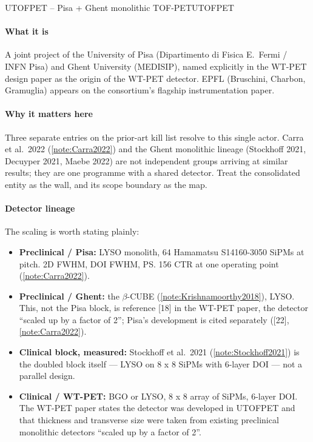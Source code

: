 \begin{programnote}{UTOFPET -- Pisa + Ghent monolithic TOF-PET}{UTOFPET}

\paragraph{What it is}
A joint project of the University of Pisa (Dipartimento di Fisica E.\ Fermi /
INFN Pisa) and Ghent University (MEDISIP), named explicitly in the WT-PET design
paper as the origin of the WT-PET detector. EPFL (Bruschini, Charbon, Gramuglia)
appears on the consortium's flagship instrumentation paper.

\paragraph{Why it matters here}
Three separate entries on the prior-art kill list resolve to this single actor.
Carra et al.\ 2022 (\ref{note:Carra2022}) and the Ghent monolithic lineage
(Stockhoff 2021, Decuyper 2021, Maebe 2022) are not independent groups arriving
at similar results; they are one programme with a shared detector. Treat the
consolidated entity as the wall, and its scope boundary as the map.

\paragraph{Detector lineage}
The scaling is worth stating plainly:

\begin{itemize}
	\item \textbf{Preclinical / Pisa:} 
		LYSO monolith, 64 Hamamatsu S14160-3050 SiPMs at  pitch.
		 2D FWHM,  DOI FWHM, \ps{156} CTR at one
		operating point (\ref{note:Carra2022}).
	\item \textbf{Preclinical / Ghent:} the $\beta$-CUBE
		(\ref{note:Krishnamoorthy2018}), 
		LYSO. This, not the Pisa block, is reference [18] in the WT-PET paper,
		the detector ``scaled up by a factor of 2''; Pisa's development is cited
		separately ([22], \ref{note:Carra2022}).
	\item \textbf{Clinical block, measured:} Stockhoff et al.\ 2021
		(\ref{note:Stockhoff2021}) is the doubled block itself ---
		 LYSO on 8 x 8
		 SiPMs with 6-layer DOI --- not a parallel
		design.
	\item \textbf{Clinical / WT-PET:} 
		BGO or LYSO, 8 x 8 array of  SiPMs,
		6-layer DOI. The WT-PET paper states the detector was developed in
		UTOFPET and that thickness and transverse size were taken from existing
		preclinical monolithic detectors ``scaled up by a factor of 2''.
\end{itemize}


\end{programnote}

